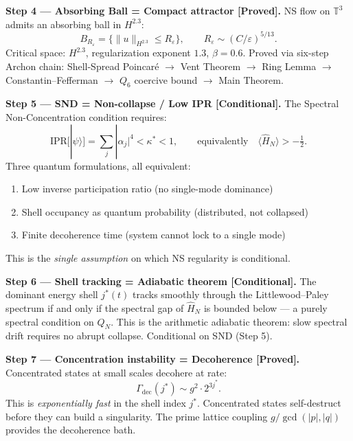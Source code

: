 \documentclass[12pt]{article}
\newcommand{\ket}[1]{|{#1}\rangle}
\begin{document}
\begin{tcolorbox}[provedbox]
\textbf{Step 4 --- Absorbing Ball = Compact attractor [Proved].}
\cite{Archon2026}
NS flow on $\mathbb{T}^3$ admits an absorbing ball in $H^{2.3}$:
\[
  B_{R_\varepsilon} = \bigl\{\|u\|_{H^{2.3}} \le R_\varepsilon\bigr\},
  \qquad R_\varepsilon \sim (C/\varepsilon)^{5/13}.
\]
Critical space: $H^{2.3}$, regularization exponent $1.3$, $\beta = 0.6$.
Proved via six-step Archon chain:
Shell-Spread Poincar\'{e} $\to$ Vent Theorem $\to$ Ring Lemma
$\to$ Constantin--Fefferman $\to$ $Q_6$ coercive bound $\to$ Main Theorem.
\end{tcolorbox}

\begin{tcolorbox}[keybox]
\textbf{Step 5 --- SND = Non-collapse / Low IPR [Conditional].}
The Spectral Non-Concentration condition requires:
\[
  \mathrm{IPR}[\ket{\psi}] = \sum_j|\alpha_j|^4 < \kappa^* < 1,
  \qquad \text{equivalently} \quad
  \langle\hat{H}_N\rangle > -\tfrac{1}{2}.
\]
Three quantum formulations, all equivalent:
\begin{enumerate}[itemsep=2pt]
  \item Low inverse participation ratio (no single-mode dominance)
  \item Shell occupancy as quantum probability (distributed, not collapsed)
  \item Finite decoherence time (system cannot lock to a single mode)
\end{enumerate}
This is the \emph{single assumption} on which NS regularity is conditional.
\end{tcolorbox}

\begin{tcolorbox}[keybox]
\textbf{Step 6 --- Shell tracking = Adiabatic theorem [Conditional].}
The dominant energy shell $j^*(t)$ tracks smoothly through the
Littlewood--Paley spectrum if and only if the spectral gap of
$\hat{H}_N$ is bounded below --- a purely spectral condition on $Q_N$.
This is the arithmetic adiabatic theorem:
slow spectral drift requires no abrupt collapse.
Conditional on SND (Step 5).
\end{tcolorbox}

\begin{tcolorbox}[keybox]
\textbf{Step 7 --- Concentration instability = Decoherence [Proved].}
Concentrated states at small scales decohere at rate:
\[
  \Gamma_{\mathrm{dec}}(j^*) \sim g^2\cdot 2^{3j^*}.
\]
This is \emph{exponentially fast} in the shell index $j^*$.
Concentrated states self-destruct before they can build a singularity.
The prime lattice coupling $g/\gcd(|p|,|q|)$ provides the decoherence bath.
\end{tcolorbox}
\end{document}
